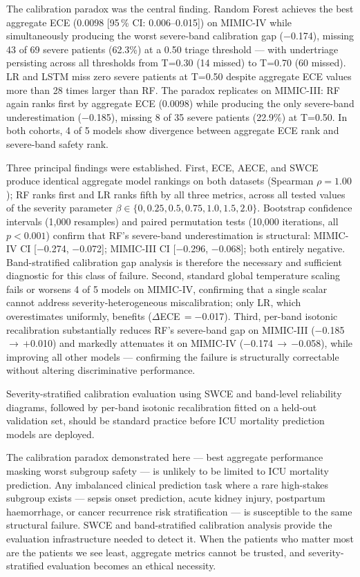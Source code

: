 \documentclass{ieeeaccess}
\begin{document}
The calibration paradox was the central finding. Random Forest achieves the best aggregate ECE (0.0098 [95\,\% CI: 0.006--0.015]) on MIMIC-IV while simultaneously producing the worst severe-band calibration gap ($-$0.174), missing 43 of 69 severe patients (62.3\%) at a 0.50 triage threshold --- with undertriage persisting across all thresholds from T=0.30 (14 missed) to T=0.70 (60 missed). LR and LSTM miss zero severe patients at T=0.50 despite aggregate ECE values more than 28 times larger than RF. The paradox replicates on MIMIC-III: RF again ranks first by aggregate ECE (0.0098) while producing the only severe-band underestimation ($-$0.185), missing 8 of 35 severe patients (22.9\%) at T=0.50. In both cohorts, 4 of 5 models show divergence between aggregate ECE rank and severe-band safety rank.

Three principal findings were established. First, ECE, AECE, and SWCE produce identical aggregate model rankings on both datasets (Spearman $\rho = 1.00$); RF ranks first and LR ranks fifth by all three metrics, across all tested values of the severity parameter $\beta \in \{0, 0.25, 0.5, 0.75, 1.0, 1.5, 2.0\}$. Bootstrap confidence intervals (1,000 resamples) and paired permutation tests (10,000 iterations, all $p < 0.001$) confirm that RF's severe-band underestimation is structural: MIMIC-IV CI [$-$0.274, $-$0.072]; MIMIC-III CI [$-$0.296, $-$0.068]; both entirely negative. Band-stratified calibration gap analysis is therefore the necessary and sufficient diagnostic for this class of failure. Second, standard global temperature scaling fails or worsens 4 of 5 models on MIMIC-IV, confirming that a single scalar cannot address severity-heterogeneous miscalibration; only LR, which overestimates uniformly, benefits ($\Delta$ECE\,$= -$0.017). Third, per-band isotonic recalibration substantially reduces RF's severe-band gap on MIMIC-III ($-$0.185\,$\rightarrow$\,$+$0.010) and markedly attenuates it on MIMIC-IV ($-$0.174\,$\rightarrow$\,$-$0.058), while improving all other models --- confirming the failure is structurally correctable without altering discriminative performance.

Severity-stratified calibration evaluation using SWCE and band-level reliability diagrams, followed by per-band isotonic recalibration fitted on a held-out validation set, should be standard practice before ICU mortality prediction models are deployed.

The calibration paradox demonstrated here --- best aggregate performance masking worst subgroup safety --- is unlikely to be limited to ICU mortality prediction. Any imbalanced clinical prediction task where a rare high-stakes subgroup exists --- sepsis onset prediction, acute kidney injury, postpartum haemorrhage, or cancer recurrence risk stratification --- is susceptible to the same structural failure. SWCE and band-stratified calibration analysis provide the evaluation infrastructure needed to detect it. When the patients who matter most are the patients we see least, aggregate metrics cannot be trusted, and severity-stratified evaluation becomes an ethical necessity.
\end{document}
